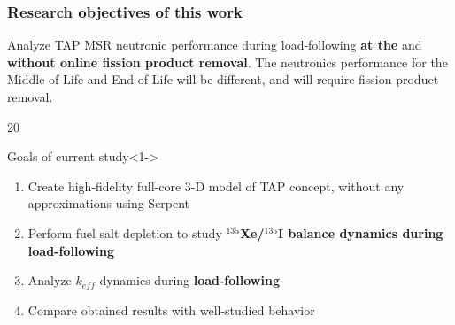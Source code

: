 \begin{frame}
  \frametitle{Research objectives of this work}
     Analyze TAP MSR neutronic performance during load-following 
     \textbf{at the } and \textbf{without online fission 
     product removal}. The neutronics performance for the Middle of 
     Life and End of Life will be different, and will require fission product 
        removal.
  \begin{overlayarea}{\linewidth}{20\baselineskip}
     \begin{block}{Goals of current study}<1->
         \begin{enumerate}
         		\itemsep1em
                \item<1-> Create high-fidelity full-core 3-D model of 
                TAP concept, without any approximations using Serpent 
                \cite{leppanen_serpent_2014}
                \item<2-> Perform fuel salt depletion to study 
                \textbf{$^{135}$Xe/$^{135}$I balance dynamics during 
                load-following}
            	\item<3-> Analyze $k_{eff}$ dynamics during 
            	\textbf{load-following}
                \item<4-> Compare obtained results with well-studied 
                 behavior
         \end{enumerate}
      \end{block}
  \end{overlayarea}
\end{frame}
